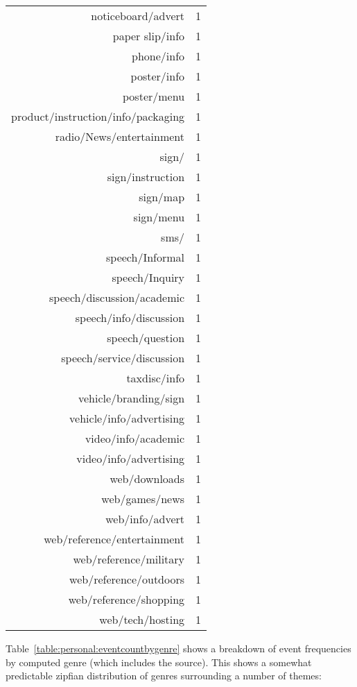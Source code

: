 \begin{longtable}{rr}
      noticeboard/advert &   1 \\ 
      paper slip/info &   1 \\ 
      phone/info &   1 \\ 
      poster/info &   1 \\ 
      poster/menu &   1 \\ 
      product/instruction/info/packaging &   1 \\ 
      radio/News/entertainment &   1 \\ 
      sign/ &   1 \\ 
      sign/instruction &   1 \\ 
      sign/map &   1 \\ 
      sign/menu &   1 \\ 
      sms/ &   1 \\ 
      speech/Informal &   1 \\ 
      speech/Inquiry &   1 \\ 
      speech/discussion/academic &   1 \\ 
      speech/info/discussion &   1 \\ 
      speech/question &   1 \\ 
      speech/service/discussion &   1 \\ 
      taxdisc/info &   1 \\ 
      vehicle/branding/sign &   1 \\ 
      vehicle/info/advertising &   1 \\ 
      video/info/academic &   1 \\ 
      video/info/advertising &   1 \\ 
      web/downloads &   1 \\ 
      web/games/news &   1 \\ 
      web/info/advert &   1 \\ 
      web/reference/entertainment &   1 \\ 
      web/reference/military &   1 \\ 
      web/reference/outdoors &   1 \\ 
      web/reference/shopping &   1 \\ 
      web/tech/hosting &   1 \\ 
       \hline
\end{longtable}


Table~\ref{table:personal:eventcountbygenre} shows a breakdown of event frequencies by computed genre  (which includes the source).  This shows a somewhat predictable zipfian distribution of genres surrounding a number of themes:

